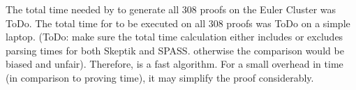 The total time needed by {\SPASS} to generate all 308 proofs on the Euler Cluster was ToDo. The total time for {\SFOLowerUnits} to be executed on all 308 proofs was ToDo on a simple laptop. (ToDo: make sure the total time calculation either includes or excludes parsing times for both Skeptik and SPASS. otherwise the comparison would be biased and unfair). Therefore, {\SFOLowerUnits} is a fast algorithm. For a small overhead in time (in comparison to proving time), it may simplify the proof considerably.







